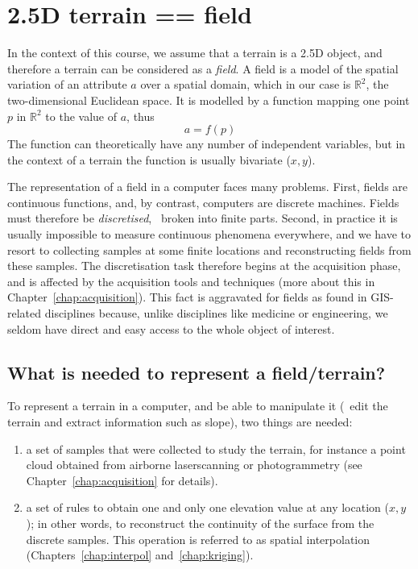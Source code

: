 %
\section{2.5D terrain == field}

In the context of this course, we assume that a terrain is a 2.5D object, and therefore a terrain can be considered as a \emph{field}.%
A field is a model of the spatial variation of an attribute $a$ over a spatial domain, which in our case is $\mathbb{R}^2$, the two-dimensional Euclidean space.%
It is modelled by a function mapping one point $p$ in $\mathbb{R}^2$ to the value of $a$, thus 
\[
  a = f(p)
\]
The function can theoretically have any number of independent variables, but in the context of a terrain the function is usually bivariate ($x,y$).

%

The representation of a field in a computer faces many problems. 
First, fields are continuous functions, and, by contrast, computers are discrete machines. 
Fields must therefore be \emph{discretised}, \ie\ broken into finite parts.%
Second, in practice it is usually impossible to measure continuous phenomena everywhere, and we have to resort to collecting samples at some finite locations and reconstructing fields from these samples.
The discretisation task therefore begins at the acquisition phase, and is affected by the acquisition tools and techniques (more about this in Chapter~\ref{chap:acquisition}).
This fact is aggravated for fields as found in GIS-related disciplines because, unlike disciplines like medicine or engineering, we seldom have direct and easy access to the whole object of interest.


\subsection{What is needed to represent a field/terrain?}

To represent a terrain in a computer, and be able to manipulate it (\ie\ edit the terrain and extract information such as slope), two things are needed:
\begin{enumerate}
  \item a set of samples that were collected to study the terrain, for instance a point cloud obtained from airborne laserscanning or photogrammetry (see Chapter~\ref{chap:acquisition} for details).
  \item a set of rules to obtain one and only one elevation value at any location ($x,y$); in other words, to reconstruct the continuity of the surface from the discrete samples.
  This operation is referred to as spatial interpolation (Chapters~\ref{chap:interpol} and~\ref{chap:kriging}). 
\end{enumerate}


